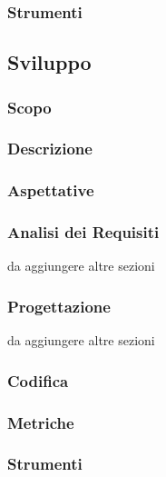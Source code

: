 \subsubsection{Strumenti}

\subsection{Sviluppo}

\subsubsection{Scopo}

\subsubsection{Descrizione}

\subsubsection{Aspettative}

\subsubsection{Analisi dei Requisiti}

da aggiungere altre sezioni

\subsubsection{Progettazione}

da aggiungere altre sezioni

\subsubsection{Codifica}

\subsubsection{Metriche}

\subsubsection{Strumenti}